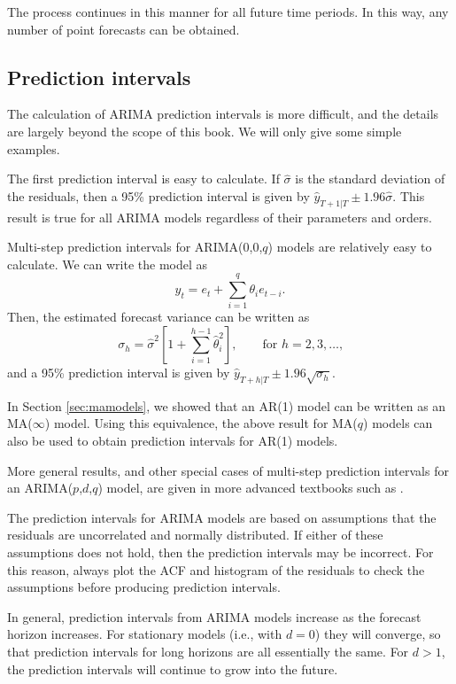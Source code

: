 \documentclass[]{book}
\begin{document}
The process continues in this manner for all future time periods. In this way, any number of point forecasts can be obtained.

\hypertarget{prediction-intervals-1}{%
\subsection*{Prediction intervals}\label{prediction-intervals-1}}

The calculation of ARIMA prediction intervals is more difficult, and the details are largely beyond the scope of this book. We will only give some simple examples.

The first prediction interval is easy to calculate. If \(\hat{\sigma}\) is the standard deviation of the residuals, then a 95\% prediction interval is given by \(\hat{y}_{T+1|T} \pm 1.96\hat{\sigma}\). This result is true for all ARIMA models regardless of their parameters and orders.

Multi-step prediction intervals for ARIMA(0,0,\(q\)) models are relatively
easy to calculate. We can write the model as
\[
  y_t = e_t + \sum_{i=1}^q \theta_i e_{t-i}.
\]
Then, the estimated forecast variance can be written as
\[
  \sigma_h = \hat{\sigma}^2 \left[ 1 + \sum_{i=1}^{h-1} \hat{\theta}_i^2\right], \qquad\text{for $h=2,3,\dots$,}
\]
and a 95\% prediction interval is given by \(\hat{y}_{T+h|T} \pm 1.96\sqrt{\sigma_h}\).

In Section \ref{sec:mamodels}, we showed that an AR(1) model can be written as an MA(\(\infty\)) model. Using this equivalence, the above result for MA(\(q\)) models can also be used to obtain prediction intervals for AR(1) models.

More general results, and other special cases of multi-step prediction intervals for an ARIMA(\(p\),\(d\),\(q\)) model, are given in more advanced textbooks such as \citet{BDbook16}.

The prediction intervals for ARIMA models are based on assumptions that the residuals are uncorrelated and normally distributed. If either of these assumptions does not hold, then the prediction intervals may be incorrect. For this reason, always plot the ACF and histogram of the residuals to check the assumptions before producing prediction intervals.

In general, prediction intervals from ARIMA models increase as the forecast horizon increases. For stationary models (i.e., with \(d=0\)) they will converge, so that prediction intervals for long horizons are all essentially the same. For \(d>1\), the prediction intervals will continue to grow into the future.
\end{document}
